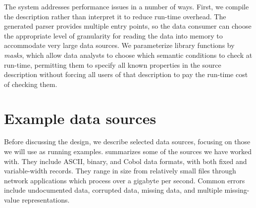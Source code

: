 \documentclass{sig-alternate}
\begin{document}
The \pads{} system addresses performance issues in a number of ways.
First, we compile the \pads{} description rather than interpret it to reduce run-time overhead.
The generated parser provides  multiple entry points, so the data consumer can choose 
the appropriate level of granularity for reading the data into memory to accommodate very large data sources.
We parameterize library functions by \textit{masks}, which allow data analysts to 
choose which semantic conditions to check at run-time, permitting them to specify
all known properties in the source description without forcing all users of that 
description to pay the run-time cost of checking them.  


\section{Example data sources}

Before discussing the \pads{} design, we describe selected data
sources, focusing on those we will use as running examples.
 summarizes some of the sources we have
worked with.  They include ASCII, binary, and Cobol data formats, with
both fixed and variable-width records.  They range in size from
relatively small files through network applications which process over
a gigabyte per second.  Common errors include undocumented data,
corrupted data, missing data, and multiple missing-value
representations.
\end{document}
